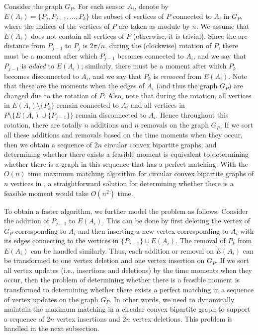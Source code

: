 \documentclass[11pt]{article}
\begin{document}
Consider the graph $G_P$. For each sensor $A_i$, denote by
$E(A_i)=\{P_j,P_{j+1},\ldots,P_k\}$ the subset of vertices of $P$ connected to
$A_i$ in $G_P$, where the indices of the vertices of $P$ are
taken as module by $n$. We assume that $E(A_i)$ does not contain all
vertices of $P$ (otherwise, it is trivial). Since the arc distance
from $P_{j-1}$ to $P_j$ is $2\pi/n$, during the (clockwise) rotation
of $P$, there must be a moment after which $P_{j-1}$ becomes connected to
$A_i$, and we say that $P_{j-1}$ is {\em added} to $E(A_i)$; similarly,
there must be a moment after which $P_{k}$ becomes disconnected to $A_i$,
and we say that $P_{k}$ is {\em removed} from $E(A_i)$.
Note that these are the moments when the edges of $A_i$ (and thus the graph $G_P$)
are changed due to the rotation of $P$.  Also, note that during the rotation, all
vertices in $E(A_i)\setminus \{P_k\}$ remain connected to $A_i$ and
all vertices in $P\setminus \{E(A_i) \cup \{P_{j-1}\}\}$ remain
disconnected to $A_i$. Hence throughout this rotation,
there are totally $n$ additions and $n$ removals on the graph $G_P$.
If we sort all these additions and removals based on the time
moments when they occur, then we obtain a sequence of $2n$ circular
convex bipartite graphs, and determining whether there exists a
feasible moment is equivalent to determining whether there is a graph
in this sequence that has a perfect matching. With the $O(n)$ time maximum matching
algorithm for circular convex bipartite graphs of $n$ vertices in
\cite{ref:LiangCi95}, a straightforward solution for determining whether there
is a feasible moment would take $O(n^2)$ time.

To obtain a faster algorithm, we further model the problem as follows.
Consider the addition of $P_{j-1}$ to $E(A_i)$. This can be done
by first deleting the vertex of $G_P$ corresponding to $A_i$ and
then inserting a new vertex corresponding to $A_i$ with its edges connecting
to the vertices in $\{P_{j-1}\}\cup E(A_i)$.
The removal of $P_k$ from $E(A_i)$ can be handled similarly. Thus,
each addition or removal on $E(A_i)$ can be transformed to one vertex
deletion and one vertex insertion on $G_P$. If we sort all vertex
updates (i.e., insertions and deletions) by the time moments when
they occur, then the problem of determining whether there is a feasible moment is
transformed to determining whether there exists a perfect matching
in a sequence of vertex updates on the graph $G_P$. In other words, we need to
dynamically maintain the maximum matching in a circular convex
bipartite graph to support a sequence of $2n$ vertex insertions and
$2n$ vertex deletions.  This problem is handled in the next
subsection.
\end{document}
